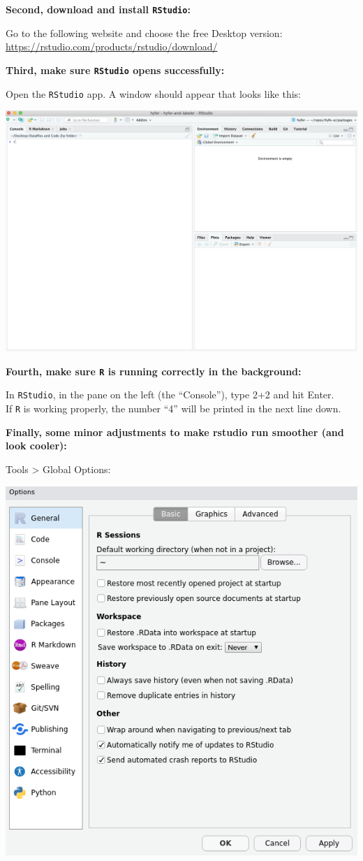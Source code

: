 \documentclass[
]{book}
\begin{document}
\textbf{Second, download and install \texttt{RStudio}:}

Go to the following website and choose the free Desktop version:
\url{https://rstudio.com/products/rstudio/download/}

\textbf{Third, make sure \texttt{RStudio} opens successfully:}

Open the \texttt{RStudio} app. A window should appear that looks like this:

\includegraphics{img/rstudio_firstopen.png}

\textbf{Fourth, make sure \texttt{R} is running correctly in the background:}

In \texttt{RStudio}, in the pane on the left (the ``Console''), type 2+2 and hit Enter.\\
If \texttt{R} is working properly, the number ``4'' will be printed in the next line down.

\textbf{Finally, some minor adjustments to make rstudio run smoother (and look cooler):}

Tools \textgreater{} Global Options:

\includegraphics{img/rstudio_settings.png}
\end{document}
